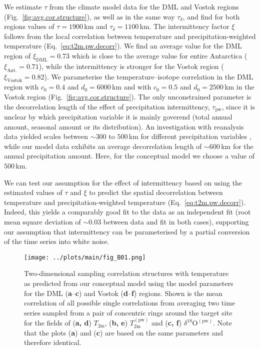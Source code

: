 \documentclass[cp, manuscript]{copernicus}
\begin{document}
We estimate $\tau$ from the climate model data for the DML and Vostok regions
(Fig.~\ref{fig:avg.cor.structure}), as well as in the same way
$\tau_{\delta}$, and find for both regions values of $\tau=1900$\,km and
$\tau_{\delta}=1100$\,km. The intermittency factor $\xi$ follows from the
local correlation between temperature and precipitation-weighted temperature
(Eq.~\ref{eq:t2m.pw.decorr}). We find an average value for the DML region of
$\xi_{\mathrm{DML}}=0.73$ which is close to the average value for entire
Antarctica ($\xi_{\mathrm{Ant.}}=0.71$), while the intermittency is stronger for
the Vostok region ($\xi_{\mathrm{Vostok}}=0.82$). We parameterise the
temperature--isotope correlation in the DML region with $c_0=0.4$ and
$d_0=6000$\,km and with $c_0=0.5$ and $d_0=2500$\,km in the Vostok region
(Fig.~\ref{fig:avg.cor.structure}). The only unconstrained parameter is the
decorrelation length of the effect of precipitation intermittency,
$\tau_{\mathrm{pw}}$, since it is unclear by which precipitation variable it is
mainly goverend (total annual amount, seasonal amount or its distribution). An
investigation with reanalysis data yielded scales between $\sim300$ to $500$\,km
for different precipitation variables \citep{Munch2018a}, while our model data
exhibits an average decorrelation length of $\sim600$\,km for the annual
precipitation amount. Here, for the conceptual model we choose a value of
$500$\,km.

We can test our assumption for the effect of intermittency based on using the
estimated values of $\tau$ and $\xi$ to predict the spatial decorrelation
between temperature and precipitation-weighted temperature
(Eq.~\ref{eq:t2m.pw.decorr}). Indeed, this yields a comparably good fit to the
data as an independent fit (root mean square deviation of $\sim0.03$ between
data and fit in both cases), supporting our assumption that intermittency can be
parameterised by a partial conversion of the time series into white noise.

\begin{figure*}[t]%
\centering
\texttt{[image: ../plots/main/fig\_B01.png]}
\caption{%
  Two-dimensional sampling correlation structures with temperature as predicted
  from our conceptual model using the model parameters for the DML
  (\textbf{a}--\textbf{c}) and Vostok (\textbf{d}--\textbf{f}) regions. Shown
  is the mean correlation of all possible single correlations from averaging two
  time series sampled from a pair of concentric rings around the target site for
  the fields of (\textbf{a, d}) $T_{\mathrm{2m}}$, (\textbf{b, e})
  $T_{\mathrm{2m}}^{\mathrm{(pw)}}$ and (\textbf{c, f})
  $\delta^{18}\mathrm{O}^{\mathrm{(pw)}}$. Note that the plots (\textbf{a}) and
  (\textbf{c}) are based on the same parameters and therefore identical.}
\label{fig:conceptual.model}%
\end{figure*}%
\end{document}
